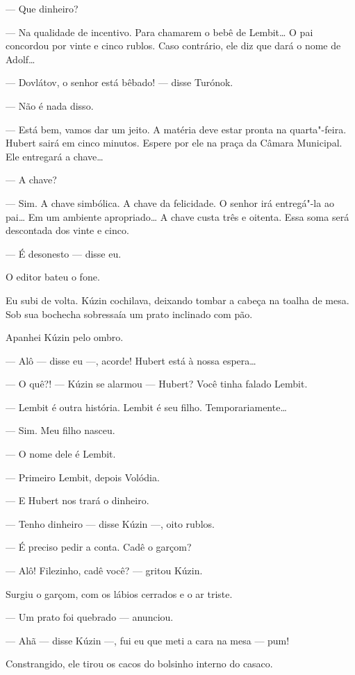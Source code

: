 --- Que dinheiro?

--- Na qualidade de incentivo. Para chamarem o bebê de Lembit\ldots{} O pai
concordou por vinte e cinco rublos. Caso contrário, ele diz que dará o
nome de Adolf\ldots{}

--- Dovlátov, o senhor está bêbado! --- disse Turónok.

--- Não é nada disso.

--- Está bem, vamos dar um jeito. A matéria deve estar pronta na
quarta"-feira. Hubert sairá em cinco minutos. Espere por ele na praça da
Câmara Municipal. Ele entregará a chave\ldots{}

--- A chave?

--- Sim. A chave simbólica. A chave da felicidade. O senhor irá
entregá"-la ao pai\ldots{} Em um ambiente apropriado\ldots{} A chave custa três e
oitenta. Essa soma será descontada dos vinte e cinco.

--- É desonesto --- disse eu.

O editor bateu o fone.

Eu subi de volta. Kúzin cochilava, deixando tombar a cabeça na toalha de
mesa. Sob sua bochecha sobressaía um prato inclinado com pão.

Apanhei Kúzin pelo ombro.

--- Alô --- disse eu ---, acorde! Hubert está à nossa espera\ldots{}

--- O quê?! --- Kúzin se alarmou --- Hubert? Você tinha falado Lembit.

--- Lembit é outra história. Lembit é seu filho. Temporariamente\ldots{}

--- Sim. Meu filho nasceu.

--- O nome dele é Lembit.

--- Primeiro Lembit, depois Volódia.

--- E Hubert nos trará o dinheiro.

--- Tenho dinheiro --- disse Kúzin ---, oito rublos.

--- É preciso pedir a conta. Cadê o garçom?

--- Alô! Filezinho, cadê você? --- gritou Kúzin.

Surgiu o garçom, com os lábios cerrados e o ar triste.

--- Um prato foi quebrado --- anunciou.

--- Ahã --- disse Kúzin ---, fui eu que meti a cara na mesa --- pum!

Constrangido, ele tirou os cacos do bolsinho interno do casaco.

